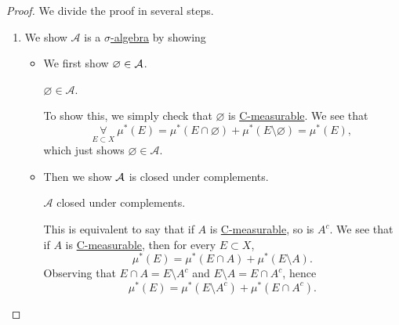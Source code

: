 \begin{proof}\let\qed\relax
	We divide the proof in several steps.
	\begin{enumerate}[(1)]
		\item We show \(\mathcal{A}\) is a \hyperref[def:sigma-algebra]{\(\sigma\)-algebra} by showing
		      \begin{itemize}
			      \item We first show \(\varnothing \in \mathcal{\MakeUppercase{a}} \).
			            \begin{claim}
				            \(\varnothing \in \mathcal{A} \).
			            \end{claim}
			            \begin{explanation}
				            To show this, we simply check that \(\varnothing \) is \hyperref[def:C-measurable]{C-measurable}. We see that
				            \[
					            \underset{E\subset X}{\forall}\ \mu^{\ast} (E) = \mu^{\ast} (E\cap \varnothing ) + \mu^{\ast} (E \setminus \varnothing ) = \mu^{\ast} (E),
				            \]
				            which just shows \(\varnothing \in \mathcal{A}\).
			            \end{explanation}
			      \item Then we show \(\mathcal{\MakeUppercase{a}} \) is closed under complements.
			            \begin{claim}
				            \(\mathcal{A} \) closed under complements.
			            \end{claim}
			            \begin{explanation}
				            This is equivalent to say that if \(A\) is \hyperref[def:C-measurable]{C-measurable}, so is \(A^{c}\).
				            We see that if \(A\) is \hyperref[def:C-measurable]{C-measurable}, then for every \(E\subset X\),
				            \[
					            \mu^{\ast} (E) = \mu^{\ast} (E\cap A) + \mu^{\ast} (E\setminus A).
				            \]
				            Observing that \(E\cap A = E\setminus A^{c} \) and \(E\setminus A = E\cap A^{c} \), hence
				            \[
					            \mu^{\ast} (E) = \mu^{\ast} (E\setminus A^{c} ) + \mu^{\ast} (E\cap A^{c} ).
				            \]


\end{explanation}
\end{itemize}
\end{enumerate}
\end{proof}
